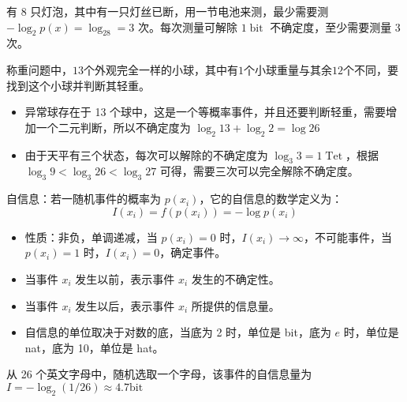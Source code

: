 \begin{remark}
    有 8 只灯泡，其中有一只灯丝已断，用一节电池来测，最少需要测 $-\log_2p(x) = \log_28 = 3$ 次。每次测量可解除 $1\operatorname{bit}$ 不确定度，至少需要测量 3 次。
\end{remark}

\begin{remark}
    称重问题中，$13$个外观完全一样的小球，其中有$1$个小球重量与其余$12$个不同，要找到这个小球并判断其轻重。

    \begin{itemize}
        \item 异常球存在于 13 个球中，这是一个等概率事件，并且还要判断轻重，需要增加一个二元判断，所以不确定度为 $\log_2 13 + \log_2 2 = \log 26$
        \item 由于天平有三个状态，每次可以解除的不确定度为 $\log_3 3 = 1\operatorname{Tet}$，根据 $\log _{3} 9<\log _{3} 26<\log _{3} 27$ 可得，需要三次可以完全解除不确定度。
    \end{itemize}
\end{remark}

\begin{remark}
    自信息：若一随机事件的概率为 $p(x_i)$，它的自信息的数学定义为：\[I(x_i) = f(p(x_i)) = -\log p(x_i)\]
    \begin{itemize}
        \item 性质：非负，单调递减，当 $p(x_i) = 0$ 时，$I(x_i) \to \infty$，不可能事件，当 $p(x_i) = 1$ 时，$I(x_i) = 0$，确定事件。
        \item 当事件 $x_i$ 发生以前，表示事件 $x_i$ 发生的不确定性。
        \item 当事件 $x_i$ 发生以后，表示事件 $x_i$ 所提供的信息量。
        \item 自信息的单位取决于对数的底，当底为 2 时，单位是 bit，底为 $e$ 时，单位是 nat，底为 10，单位是 hat。
    \end{itemize}
\end{remark}

\begin{remark}
    从 26 个英文字母中，随机选取一个字母，该事件的自信息量为 $I=-\log _{2}(1 / 26) \approx 4.7 \mathrm{bit}$
\end{remark}

